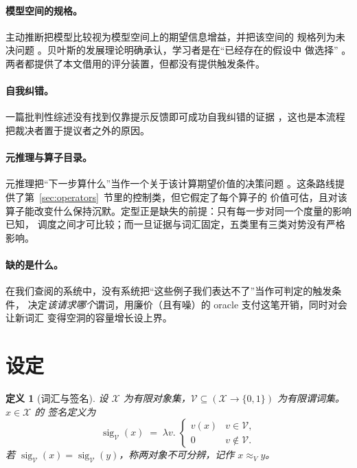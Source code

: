 \documentclass[11pt]{ctexart}
\newtheorem{definition}{定义}
\newcommand{\sig}{\operatorname{sig}}
\newcommand{\Indist}{\approx_{V}}
\newcommand{\Vocab}{\mathcal{V}}
\newcommand{\dom}{\mathcal{X}}
\begin{document}
\paragraph{模型空间的规格。} 主动推断把模型比较视为模型空间上的期望信息增益，并把该空间的
规格列为未决问题 \cite{friston2026}。贝叶斯的发展理论明确承认，学习者是在“已经存在的假设中
做选择” \cite{perfors2011}。两者都提供了本文借用的评分装置，但都没有提供触发条件。

\paragraph{自我纠错。} 一篇批判性综述没有找到仅靠提示反馈即可成功自我纠错的证据
\cite{kamoi2024}，这也是本流程把裁决者置于提议者之外的原因。

\paragraph{元推理与算子目录。} 元推理把“下一步算什么”当作一个关于该计算期望价值的决策问题
\cite{russell1991}。这条路线提供了第~\ref{sec:operators}~节里的控制类，但它假定了每个算子的
价值可估，且对该算子能改变什么保持沉默。定型正是缺失的前提：只有每一步对同一个度量的影响已知，
调度之间才可比较；而一旦证据与词汇固定，五类里有三类对势没有严格影响。

\paragraph{缺的是什么。} 在我们查阅的系统中，没有系统把“这些例子我们表达不了”当作可判定的触发条件，
决定\emph{该请求哪个}谓词，用廉价（且有噪）的 oracle 支付这笔开销，同时对会让新词汇
变得空洞的容量增长设上界。

\section{设定}\label{sec:setting}

\begin{definition}[词汇与签名]
设 $\dom$ 为有限对象集，$\Vocab \subseteq (\dom \to \{0,1\})$ 为有限谓词集。$x \in \dom$ 的
\emph{签名}定义为
\[
  \sig_{\Vocab}(x) \;=\; \lambda v.\; \begin{cases} v(x) & v \in \Vocab,\\ 0 & v \notin \Vocab.\end{cases}
\]
若 $\sig_{\Vocab}(x) = \sig_{\Vocab}(y)$，称两对象\emph{不可分辨}，记作 $x \Indist y$。
\end{definition}
\end{document}
